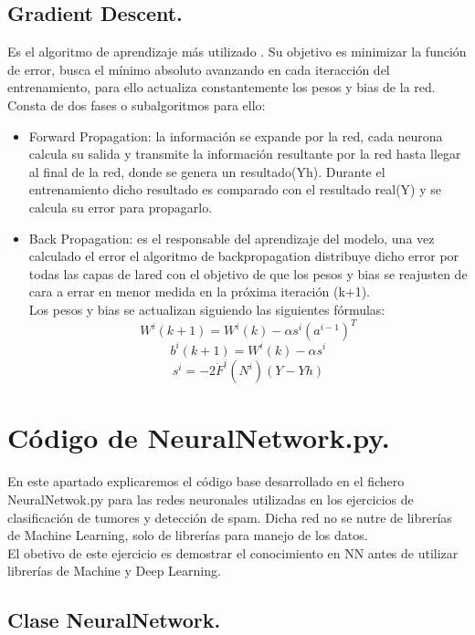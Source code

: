 \documentclass[a4paper,10pt]{article}
\begin{document}
\subsection{Gradient Descent.}
Es el algoritmo de aprendizaje más utilizado . Su objetivo es minimizar la función de error, busca el mínimo absoluto avanzando en cada iteracción del entrenamiento, para ello actualiza constantemente los pesos y bias de la red. Consta de dos fases o subalgoritmos para ello: 
\begin{itemize}
    \item Forward Propagation: la información se expande por la red, cada neurona calcula su salida y transmite la información resultante por la red hasta llegar al final de la red, donde se genera un resultado(Yh). Durante el entrenamiento dicho resultado es comparado con el resultado real(Y) y se calcula su error para propagarlo.
    \item Back Propagation: es el responsable del aprendizaje del modelo, una vez calculado el error el algoritmo de backpropagation distribuye dicho error por todas las capas de lared con el objetivo de que los pesos y bias se reajusten de cara a errar en menor medida en la próxima iteración (k+1). \\Los pesos y bias se actualizan siguiendo las siguientes fórmulas:
    \[
    W^i (k+1) = W^i (k) - \alpha s^i (a^{i-1})^T
    \]
    \[
    b^i (k+1) = W^i (k) - \alpha s^i
    \]
    \[
    s^i = -2\dot{F}^i(N^i)(Y-Yh)
    \]
    
\end{itemize}
\newpage
\section{Código de NeuralNetwork.py.}
En este apartado explicaremos el código base desarrollado en el fichero NeuralNetwok.py para las redes neuronales utilizadas en los ejercicios de clasificación de tumores y detección de spam. Dicha red no se nutre de librerías de Machine Learning, solo de librerías para manejo de los datos.\\ El obetivo de este ejercicio es demostrar el conocimiento en NN antes de utilizar librerías de Machine y Deep Learning.
\subsection{Clase NeuralNetwork.}
\end{document}
